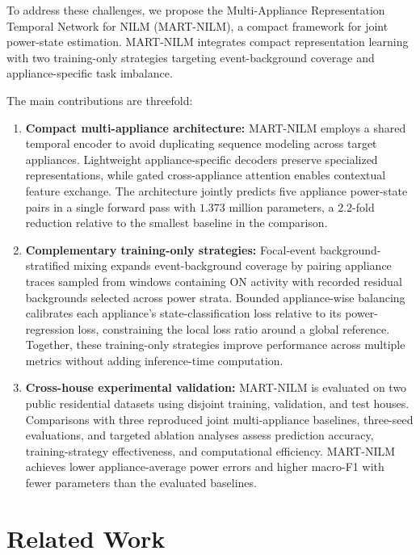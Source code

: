 \documentclass[journal]{IEEEtran}
\begin{document}
To address these challenges, we propose the Multi-Appliance Representation Temporal Network for NILM (MART-NILM), a compact framework for joint power-state estimation. MART-NILM integrates compact representation learning with two training-only strategies targeting event-background coverage and appliance-specific task imbalance.

The main contributions are threefold:
\begin{enumerate}
    \item \textbf{Compact multi-appliance architecture:} MART-NILM employs a shared temporal encoder to avoid duplicating sequence modeling across target appliances. Lightweight appliance-specific decoders preserve specialized representations, while gated cross-appliance attention enables contextual feature exchange. The architecture jointly predicts five appliance power-state pairs in a single forward pass with $1.373$ million parameters, a $2.2$-fold reduction relative to the smallest baseline in the comparison.

    \item \textbf{Complementary training-only strategies:} Focal-event background-stratified mixing expands event-background coverage by pairing appliance traces sampled from windows containing ON activity with recorded residual backgrounds selected across power strata. Bounded appliance-wise balancing calibrates each appliance's state-classification loss relative to its power-regression loss, constraining the local loss ratio around a global reference. Together, these training-only strategies improve performance across multiple metrics without adding inference-time computation.

    \item \textbf{Cross-house experimental validation:} MART-NILM is evaluated on two public residential datasets using disjoint training, validation, and test houses. Comparisons with three reproduced joint multi-appliance baselines, three-seed evaluations, and targeted ablation analyses assess prediction accuracy, training-strategy effectiveness, and computational efficiency. MART-NILM achieves lower appliance-average power errors and higher macro-F1 with fewer parameters than the evaluated baselines.
\end{enumerate}

\section{Related Work}
\label{sec:background-related-work}
\end{document}
